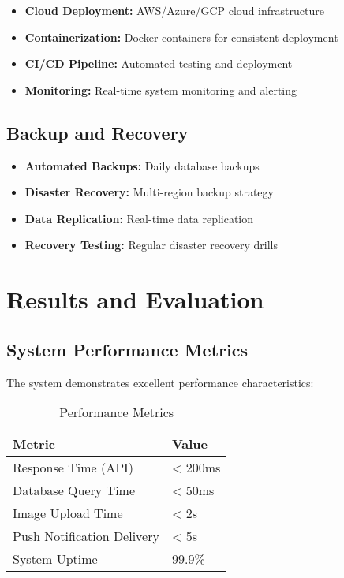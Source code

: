 \documentclass[12pt,a4paper]{article}
\begin{document}
\begin{itemize}
    \item \textbf{Cloud Deployment:} AWS/Azure/GCP cloud infrastructure
    \item \textbf{Containerization:} Docker containers for consistent deployment
    \item \textbf{CI/CD Pipeline:} Automated testing and deployment
    \item \textbf{Monitoring:} Real-time system monitoring and alerting
\end{itemize}

\subsection{Backup and Recovery}

\begin{itemize}
    \item \textbf{Automated Backups:} Daily database backups
    \item \textbf{Disaster Recovery:} Multi-region backup strategy
    \item \textbf{Data Replication:} Real-time data replication
    \item \textbf{Recovery Testing:} Regular disaster recovery drills
\end{itemize}

\section{Results and Evaluation}

\subsection{System Performance Metrics}

The system demonstrates excellent performance characteristics:

\begin{table}[H]
\centering
\caption{Performance Metrics}
\begin{tabular}{@{}ll@{}}
\toprule
\textbf{Metric} & \textbf{Value} \\
\midrule
Response Time (API) & < 200ms \\
Database Query Time & < 50ms \\
Image Upload Time & < 2s \\
Push Notification Delivery & < 5s \\
System Uptime & 99.9\% \\
\bottomrule
\end{tabular}
\end{table}
\end{document}
